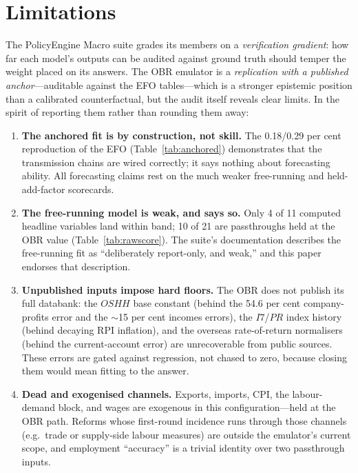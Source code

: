 \section{Limitations}
\label{sec:limitations}

The PolicyEngine Macro suite grades its members on a \emph{verification gradient}: how far each model's outputs can be audited against ground truth should temper the weight placed on its answers. The OBR emulator is a \emph{replication with a published anchor}---auditable against the EFO tables---which is a stronger epistemic position than a calibrated counterfactual, but the audit itself reveals clear limits. In the spirit of reporting them rather than rounding them away:

\begin{enumerate}
\item \textbf{The anchored fit is by construction, not skill.} The 0.18/0.29 per cent reproduction of the EFO (Table~\ref{tab:anchored}) demonstrates that the transmission chains are wired correctly; it says nothing about forecasting ability. All forecasting claims rest on the much weaker free-running and held-add-factor scorecards.

\item \textbf{The free-running model is weak, and says so.} Only 4 of 11 computed headline variables land within band; 10 of 21 are passthroughs held at the OBR value (Table~\ref{tab:rawscore}). The suite's documentation describes the free-running fit as ``deliberately report-only, and weak,'' and this paper endorses that description.

\item \textbf{Unpublished inputs impose hard floors.} The OBR does not publish its full databank: the $OSHH$ base constant (behind the 54.6 per cent company-profits error and the $\sim$15 per cent incomes errors), the $I7$/$PR$ index history (behind decaying RPI inflation), and the overseas rate-of-return normalisers (behind the current-account error) are unrecoverable from public sources. These errors are gated against regression, not chased to zero, because closing them would mean fitting to the answer.

\item \textbf{Dead and exogenised channels.} Exports, imports, CPI, the labour-demand block, and wages are exogenous in this configuration---held at the OBR path. Reforms whose first-round incidence runs through those channels (e.g.\ trade or supply-side labour measures) are outside the emulator's current scope, and employment ``accuracy'' is a trivial identity over two passthrough inputs.


\end{enumerate}
